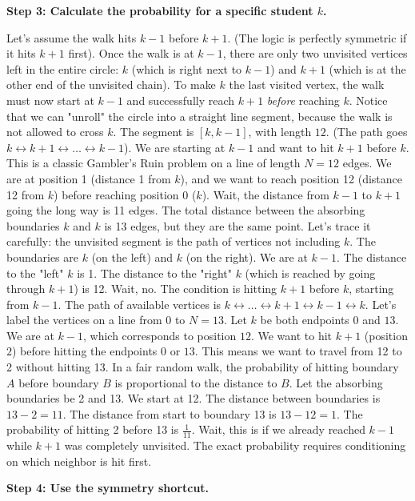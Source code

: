 \begin{solution}
\textbf{Step 3: Calculate the probability for a specific student $k$.}

Let's assume the walk hits $k-1$ before $k+1$. (The logic is perfectly symmetric if it hits $k+1$ first).
Once the walk is at $k-1$, there are only two unvisited vertices left in the entire circle: $k$ (which is right next to $k-1$) and $k+1$ (which is at the other end of the unvisited chain).
To make $k$ the last visited vertex, the walk must now start at $k-1$ and successfully reach $k+1$ \textit{before} reaching $k$.
Notice that we can "unroll" the circle into a straight line segment, because the walk is not allowed to cross $k$. The segment is $[k, k-1]$, with length $12$. (The path goes $k \leftrightarrow k+1 \leftrightarrow \dots \leftrightarrow k-1$).
We are starting at $k-1$ and want to hit $k+1$ before $k$.
This is a classic Gambler's Ruin problem on a line of length $N = 12$ edges. We are at position 1 (distance 1 from $k$), and we want to reach position 12 (distance 12 from $k$) before reaching position 0 ($k$). Wait, the distance from $k-1$ to $k+1$ going the long way is 11 edges. The total distance between the absorbing boundaries $k$ and $k$ is 13 edges, but they are the same point.
Let's trace it carefully: the unvisited segment is the path of vertices not including $k$. The boundaries are $k$ (on the left) and $k$ (on the right). We are at $k-1$. The distance to the "left" $k$ is 1. The distance to the "right" $k$ (which is reached by going through $k+1$) is 12.
Wait, no. The condition is hitting $k+1$ before $k$, starting from $k-1$. The path of available vertices is $k \leftrightarrow \dots \leftrightarrow k+1 \leftrightarrow k-1 \leftrightarrow k$.
Let's label the vertices on a line from $0$ to $N=13$. Let $k$ be both endpoints $0$ and $13$.
We are at $k-1$, which corresponds to position $12$. We want to hit $k+1$ (position $2$) before hitting the endpoints $0$ or $13$.
This means we want to travel from 12 to 2 without hitting 13.
In a fair random walk, the probability of hitting boundary $A$ before boundary $B$ is proportional to the distance to $B$.
Let the absorbing boundaries be 2 and 13. We start at 12.
The distance between boundaries is $13 - 2 = 11$. The distance from start to boundary 13 is $13 - 12 = 1$.
The probability of hitting 2 before 13 is $\frac{1}{11}$.
Wait, this is if we already reached $k-1$ while $k+1$ was completely unvisited. The exact probability requires conditioning on which neighbor is hit first.

\textbf{Step 4: Use the symmetry shortcut.}


\end{solution}
